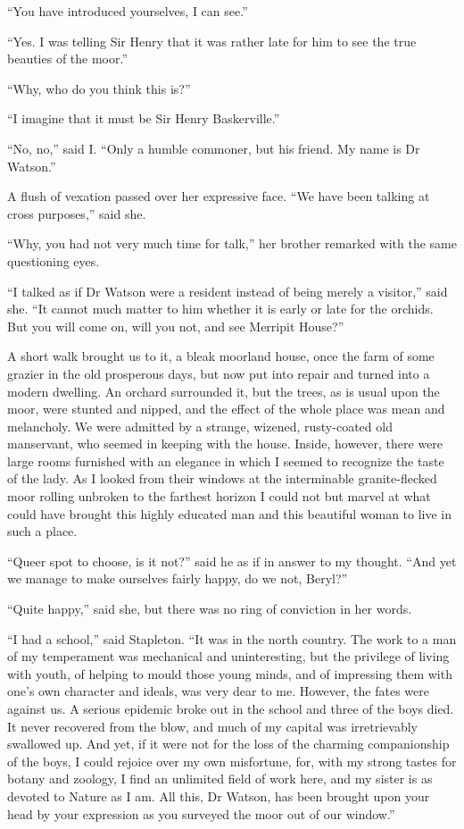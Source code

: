 \documentclass[paper=a5,BCOR=7mm,twoside,DIV=calc,12pt,usegeometry,openany,chapterprefix,endperiod,headings=big]{scrbook} %
\begin{document}
\enquote{You have introduced yourselves, I can see.}

\enquote{Yes. I was telling Sir Henry that it was rather late for him to see the true beauties of the moor.}

\enquote{Why, who do you think this is?}

\enquote{I imagine that it must be Sir Henry Baskerville.}

\enquote{No, no,} said I. \enquote{Only a humble commoner, but his friend. My name is Dr Watson.}

A flush of vexation passed over her expressive face. \enquote{We have been talking at cross purposes,} said she.

\enquote{Why, you had not very much time for talk,} her brother remarked with the same questioning eyes.

\enquote{I talked as if Dr Watson were a resident instead of being merely a visitor,} said she. \enquote{It cannot much matter to him whether it is early or late for the orchids. But you will come on, will you not, and see Merripit House?}

A short walk brought us to it, a bleak moorland house, once the farm of some grazier in the old prosperous days, but now put into repair and turned into a modern dwelling. An orchard surrounded it, but the trees, as is usual upon the moor, were stunted and nipped, and the effect of the whole place was mean and melancholy. We were admitted by a strange, wizened, rusty-coated old manservant, who seemed in keeping with the house. Inside, however, there were large rooms furnished with an elegance in which I seemed to recognize the taste of the lady. As I looked from their windows at the interminable granite-flecked moor rolling unbroken to the farthest horizon I could not but marvel at what could have brought this highly educated man and this beautiful woman to live in such a place.

\enquote{Queer spot to choose, is it not?} said he as if in answer to my thought. \enquote{And yet we manage to make ourselves fairly happy, do we not, Beryl?}

\enquote{Quite happy,} said she, but there was no ring of conviction in her words.

\enquote{I had a school,} said Stapleton. \enquote{It was in the north country. The work to a man of my temperament was mechanical and uninteresting, but the privilege of living with youth, of helping to mould those young minds, and of impressing them with one's own character and ideals, was very dear to me. However, the fates were against us. A serious epidemic broke out in the school and three of the boys died. It never recovered from the blow, and much of my capital was irretrievably swallowed up. And yet, if it were not for the loss of the charming companionship of the boys, I could rejoice over my own misfortune, for, with my strong tastes for botany and zoology, I find an unlimited field of work here, and my sister is as devoted to Nature as I am. All this, Dr Watson, has been brought upon your head by your expression as you surveyed the moor out of our window.}
\end{document}
